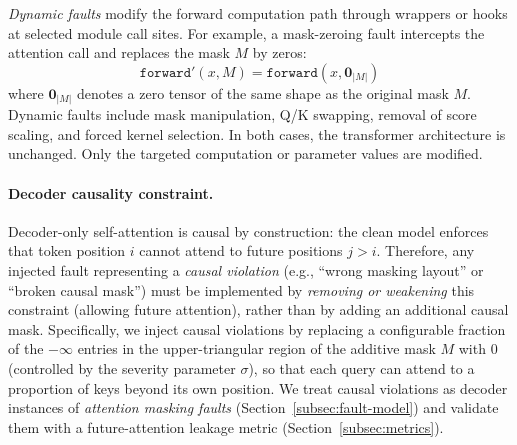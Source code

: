\emph{Dynamic faults} modify the forward computation path through wrappers or hooks at selected module call sites.
For example, a mask-zeroing fault intercepts the attention call and replaces the mask $M$ by zeros:
\begin{equation}
\texttt{forward}'(x, M) = \texttt{forward}(x, \mathbf{0}_{|M|})
\label{eq:dynamic-fault}
\end{equation}
where $\mathbf{0}_{|M|}$ denotes a zero tensor of the same shape as the original mask $M$.
Dynamic faults include mask manipulation, Q/K swapping, removal of score scaling, and forced kernel selection. In both cases, the transformer architecture is unchanged. Only the targeted computation or parameter values are modified.

\paragraph{Decoder causality constraint.}
Decoder-only self-attention is causal by construction: the clean model enforces that token position $i$ cannot attend to future positions $j>i$. Therefore, any injected fault representing a \emph{causal violation} (e.g., ``wrong masking layout'' or ``broken causal mask'') must be implemented by \emph{removing or weakening} this constraint (allowing future attention), rather than by adding an additional causal mask. Specifically, we inject causal violations by replacing a configurable fraction of the $-\infty$ entries in the upper-triangular region of the additive mask $M$ with $0$ (controlled by the severity parameter $\sigma$), so that each query can attend to a proportion of keys beyond its own position. We treat causal violations as decoder instances of \emph{attention masking faults} (Section~\ref{subsec:fault-model}) and validate them with a future-attention leakage metric (Section~\ref{subsec:metrics}).


